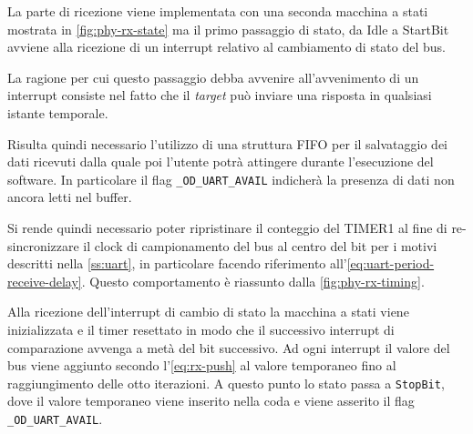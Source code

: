 \begin{figure}[p]
    \checkoddpage%
    \ifoddpage%
    \else
    \fi
\end{figure}



La parte di ricezione viene implementata con una seconda macchina a stati mostrata in \cref{fig:phy-rx-state} ma il primo passaggio di stato, da Idle a StartBit avviene alla ricezione di un interrupt relativo al cambiamento di stato del bus.

La ragione per cui questo passaggio debba avvenire all'avvenimento di un interrupt consiste nel fatto che il \textit{target} può inviare una risposta in qualsiasi istante temporale.

Risulta quindi necessario l'utilizzo di una struttura FIFO per il salvataggio dei dati ricevuti dalla quale poi l'utente potrà attingere durante l'esecuzione del software. In particolare il flag \texttt{\_OD\_UART\_AVAIL} indicherà la presenza di dati non ancora letti nel buffer.

Si rende quindi necessario poter ripristinare il conteggio del TIMER1 al fine di re-sincronizzare il clock di campionamento del bus al centro del bit per i motivi descritti nella \cref{ss:uart}, in particolare facendo riferimento all'\cref{eq:uart-period-receive-delay}. Questo comportamento è riassunto dalla \cref{fig:phy-rx-timing}.

Alla ricezione dell'interrupt di cambio di stato la macchina a stati viene inizializzata e il timer resettato in modo che il successivo interrupt di comparazione avvenga a metà del bit successivo. Ad ogni interrupt il valore del bus viene aggiunto secondo l'\cref{eq:rx-push} al valore temporaneo fino al raggiungimento delle otto iterazioni. A questo punto lo stato passa a \texttt{StopBit}, dove il valore temporaneo viene inserito nella coda e viene asserito il flag \texttt{\_OD\_UART\_AVAIL}.

